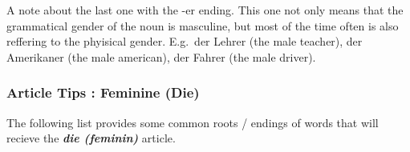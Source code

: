 \documentclass[a4paper,twocolumn,10pt]{article}
\newcommand{\newpar}
{\par \vspace{0.3cm}}
\begin{document}
\vspace{0.2cm}

\linenumbers



A note about the last one with the -er ending. This one not only means that the
grammatical gender of the noun is masculine, but most of the time often is also
reffering to the phyisical gender. E.g.\ der Lehrer (the male teacher), der
Amerikaner (the male american), der Fahrer (the male driver).\newpar



\subsubsection{Article Tips : Feminine (Die)}
\label{sssec:article_tips_feminine_die_}

The following list provides some common roots / endings of words that will
recieve the \textbf{\textit{die (feminin)}} article.


\nolinenumbers

\vspace{0.2cm}
\end{document}
